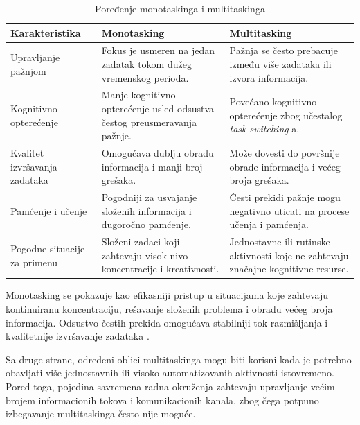 \documentclass[12pt,a4paper]{article}
\begin{document}
\begin{table}[H]
\centering
\caption{Poređenje monotaskinga i multitaskinga}
\label{tab:poredjenje}

\begin{tabular}{|
>{\RaggedRight\arraybackslash}p{3.8cm}|
>{\RaggedRight\arraybackslash}p{5cm}|
>{\RaggedRight\arraybackslash}p{5cm}|}
\hline

\textbf{Karakteristika} & \textbf{Monotasking} & \textbf{Multitasking} \\
\hline

Upravljanje pažnjom & Fokus je usmeren na jedan zadatak tokom dužeg vremenskog perioda. & Pažnja se često prebacuje između više zadataka ili izvora informacija. \\
\hline

Kognitivno opterećenje & Manje kognitivno opterećenje usled odsustva čestog preusmeravanja pažnje. & Povećano kognitivno opterećenje zbog učestalog \textit{task switching}-a. \\
\hline

Kvalitet izvršavanja zadataka & Omogućava dublju obradu informacija i manji broj grešaka. & Može dovesti do površnije obrade informacija i većeg broja grešaka. \\
\hline

Pamćenje i učenje & Pogodniji za usvajanje složenih informacija i dugoročno pamćenje. & Česti prekidi pažnje mogu negativno uticati na procese učenja i pamćenja. \\
\hline

Pogodne situacije za primenu & Složeni zadaci koji zahtevaju visok nivo koncentracije i kreativnosti. & Jednostavne ili rutinske aktivnosti koje ne zahtevaju značajne kognitivne resurse. \\
\hline

\end{tabular}
\end{table}

Monotasking se pokazuje kao efikasniji pristup u situacijama koje zahtevaju kontinuiranu koncentraciju, rešavanje složenih problema i obradu većeg broja informacija. Odsustvo čestih prekida omogućava stabilniji tok razmišljanja i kvalitetnije izvršavanje zadataka \cite{rubinstein2001,leroy2009}.

Sa druge strane, određeni oblici multitaskinga mogu biti korisni kada je potrebno obavljati više jednostavnih ili visoko automatizovanih aktivnosti istovremeno. Pored toga, pojedina savremena radna okruženja zahtevaju upravljanje većim brojem informacionih tokova i komunikacionih kanala, zbog čega potpuno izbegavanje multitaskinga često nije moguće.
\end{document}
